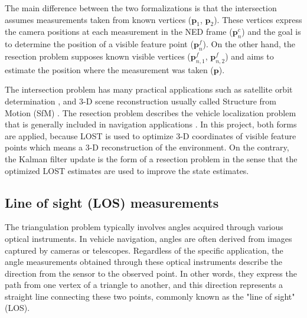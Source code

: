 The main difference between the two formalizations is that the intersection assumes measurements taken from known vertices ($\mathbf{p}_1$, $\mathbf{p}_2$). These vertices express the camera positions at each measurement in the NED frame ($\mathbf{p}_n^c$) and the goal is to determine the position of a visible feature point ($\mathbf{p}_n^f$). On the other hand, the resection problem supposes known visible vertices ($\mathbf{p}_{n, 1}^f$, $\mathbf{p}_{n, 2}^f$) and aims to estimate the position where the measurement was taken ($\mathbf{p}$).

The intersection problem has many practical applications such as satellite orbit determination \cite{TriagulationSpaceOrb1, TriagulationSpaceOrb2}, and 3-D scene reconstruction usually called Structure from Motion (SfM) \cite{Triang3D1, Triang3D2, Triang3D3}. The resection problem describes the vehicle localization problem that is generally included in navigation applications \cite{rel-nav-1, rel-nav-2, TriangNav}. In this project, both forms are applied, because LOST is used to optimize 3-D coordinates of visible feature points which means a 3-D reconstruction of the environment. On the contrary, the Kalman filter update is the form of a resection problem in the sense that the optimized LOST estimates are used to improve the state estimates.

\subsection{Line of sight (LOS) measurements}

The triangulation problem typically involves angles acquired through various optical instruments. In vehicle navigation, angles are often derived from images captured by cameras or telescopes. Regardless of the specific application, the angle measurements obtained through these optical instruments describe the direction from the sensor to the observed point. In other words, they express the path from one vertex of a triangle to another, and this direction represents a straight line connecting these two points, commonly known as the "line of sight" (LOS).

